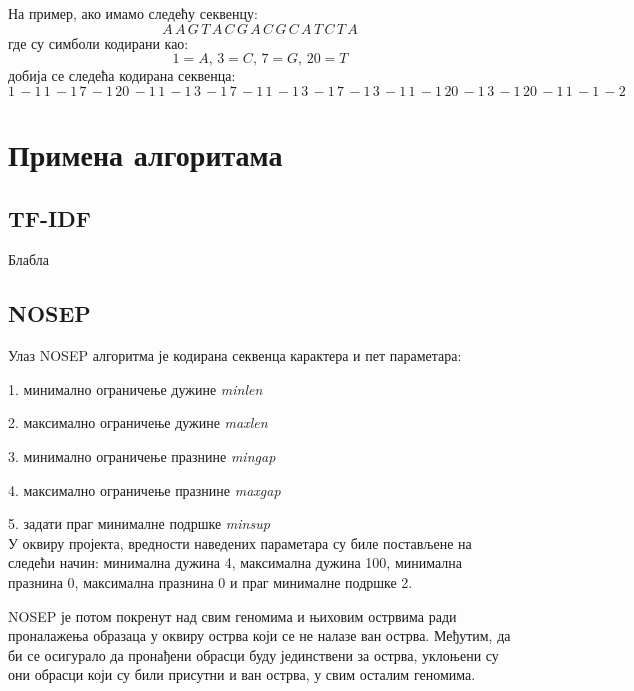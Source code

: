 \documentclass[12pt]{article}
\begin{document}
На пример, ако имамо следећу секвенцу:
$$ A\,  A\, G\, T\, A\, C\, G\, A\, C\, G\, C\, A\, T\, C\, T\, A  $$
где су симболи кодирани као:
$$ 1 = A,\, 3 = C,\, 7 = G,\, 20 = T $$
добија се следећа кодирана секвенца:
$$ 1\, -1\, 1\, -1\, 7\, -1\, 20\, -1\, 1\, -1\, 3\, -1\, 7\, -1\, 1\, -1\, 3\, -1\, 7\, -1\, 3\, -1\, 1\, -1\, 20\, -1\, 3\, -1\, 20\, -1\, 1\, -1\, -2\, $$


\section{Примена алгоритама}

\subsection{TF-IDF}

Блабла

\subsection{NOSEP}


Улаз NOSEP алгоритма је кодирана секвенца карактера и пет параметара:

1. минимално ограничење дужине \textit{minlen}

2. максимално ограничење дужине \textit{maxlen}

3. минимално ограничење празнине \textit{mingap}

4. максимално ограничење празнине \textit{maxgap}

5. задати праг минималне подршке \textit{minsup}\\


У оквиру пројекта, вредности наведених параметара су биле постављене на следећи начин: минимална дужина 4, максимална дужина 100, минимална празнина 0, максимална празнина 0 и праг минималне подршке 2.

NOSEP је потом покренут над свим геномима и њиховим острвима ради проналажења образаца у оквиру острва који се не налазе ван острва. Међутим, да би се осигурало да пронађени обрасци буду јединствени за острва, уклоњени су они обрасци који су били присутни и ван острва, у свим осталим геномима.

\newpage

\end{document}
